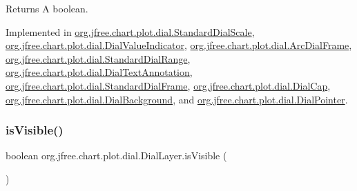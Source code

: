 \begin{DoxyReturn}{Returns}
A boolean. 
\end{DoxyReturn}


Implemented in \mbox{\hyperlink{classorg_1_1jfree_1_1chart_1_1plot_1_1dial_1_1_standard_dial_scale_a3641b7ce81095160a7bd915ffee46b46}{org.\+jfree.\+chart.\+plot.\+dial.\+Standard\+Dial\+Scale}}, \mbox{\hyperlink{classorg_1_1jfree_1_1chart_1_1plot_1_1dial_1_1_dial_value_indicator_ab1f7edc5ebda4b9b2060e733d27cc674}{org.\+jfree.\+chart.\+plot.\+dial.\+Dial\+Value\+Indicator}}, \mbox{\hyperlink{classorg_1_1jfree_1_1chart_1_1plot_1_1dial_1_1_arc_dial_frame_a6d67ce94c71e357d38bd4c99017418a0}{org.\+jfree.\+chart.\+plot.\+dial.\+Arc\+Dial\+Frame}}, \mbox{\hyperlink{classorg_1_1jfree_1_1chart_1_1plot_1_1dial_1_1_standard_dial_range_a9bbb52c3f7a46027f8ce7a2736b14391}{org.\+jfree.\+chart.\+plot.\+dial.\+Standard\+Dial\+Range}}, \mbox{\hyperlink{classorg_1_1jfree_1_1chart_1_1plot_1_1dial_1_1_dial_text_annotation_a341292864b0a591544a890548e4d68d5}{org.\+jfree.\+chart.\+plot.\+dial.\+Dial\+Text\+Annotation}}, \mbox{\hyperlink{classorg_1_1jfree_1_1chart_1_1plot_1_1dial_1_1_standard_dial_frame_a3d7725c15ddb58b403492a1f4f48a24a}{org.\+jfree.\+chart.\+plot.\+dial.\+Standard\+Dial\+Frame}}, \mbox{\hyperlink{classorg_1_1jfree_1_1chart_1_1plot_1_1dial_1_1_dial_cap_a46ceaed99922a02c843f115a3691d467}{org.\+jfree.\+chart.\+plot.\+dial.\+Dial\+Cap}}, \mbox{\hyperlink{classorg_1_1jfree_1_1chart_1_1plot_1_1dial_1_1_dial_background_a739b0c346187530a0a5a953cb92d03d8}{org.\+jfree.\+chart.\+plot.\+dial.\+Dial\+Background}}, and \mbox{\hyperlink{classorg_1_1jfree_1_1chart_1_1plot_1_1dial_1_1_dial_pointer_a4b4c8a88080051d443db95941d01dce1}{org.\+jfree.\+chart.\+plot.\+dial.\+Dial\+Pointer}}.

\mbox{\label{interfaceorg_1_1jfree_1_1chart_1_1plot_1_1dial_1_1_dial_layer_a54a8415c6f856c550d1b92cf3139731d}} 
\subsubsection{\texorpdfstring{is\+Visible()}{isVisible()}}
{\footnotesize\ttfamily boolean org.\+jfree.\+chart.\+plot.\+dial.\+Dial\+Layer.\+is\+Visible (\begin{DoxyParamCaption}{ }\end{DoxyParamCaption})}

